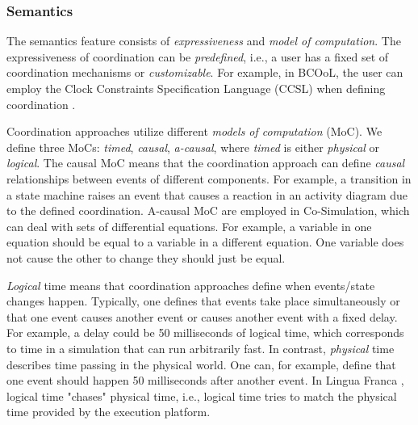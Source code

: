 \documentclass[runningheads]{llncs}
\begin{document}
\subsubsection{Semantics} The semantics feature consists of \textit{expressiveness} and \textit{model of computation}.
The expressiveness of coordination can be \textit{predefined}, i.e., a user has a fixed set of coordination mechanisms or \textit{customizable}.
For example, in BCOoL, the user can employ the Clock Constraints Specification Language (CCSL) \cite{andreSyntaxSemanticsClock2009} when defining coordination \cite{varalarsenBCOolBehavioralCoordination2016,varalarsenBehavioralCoordinationOperator2015}.

Coordination approaches utilize different \textit{models of computation} (MoC).
We define three MoCs: \textit{timed}, \textit{causal}, \textit{a-causal}, where \textit{timed} is either \textit{physical} or \textit{logical}.
The causal MoC means that the coordination approach can define \textit{causal} relationships between events of different components.
For example, a transition in a state machine raises an event that causes a reaction in an activity diagram due to the defined coordination.
A-causal MoC are employed in Co-Simulation, which can deal with sets of differential equations.
For example, a variable in one equation should be equal to a variable in a different equation.
One variable does not cause the other to change they should just be equal.

\textit{Logical} time means that coordination approaches define when events/state changes happen.
Typically, one defines that events take place simultaneously or that one event causes another event or causes another event with a fixed delay.
For example, a delay could be 50 milliseconds of logical time, which corresponds to time in a simulation that can run arbitrarily fast. 
In contrast, \textit{physical} time describes time passing in the physical world.
One can, for example, define that one event should happen 50 milliseconds after another event.
In Lingua Franca \cite{lohstrohReactorsDeterministicModel2020}, logical time "chases" physical time, i.e., logical time tries to match the physical time provided by the execution platform.
\end{document}
